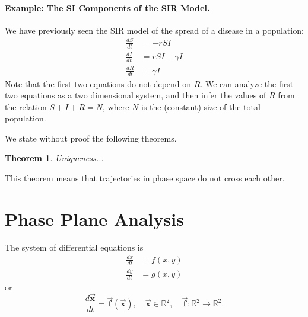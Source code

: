 \documentclass[reqno]{immbook}
\newcommand{\BF}{\vec{\textbf{f}}}
\newcommand{\BX}{\vec{\textbf{x}}}
\newtheorem{theorem}{Theorem}
\begin{document}
\paragraph{Example: The SI Components of the SIR Model.}
We have previously seen the SIR model of the spread of
a disease in a population:
\begin{equation}
\begin{split}
   \frac{dS}{dt} & = -rSI \\
   \frac{dI}{dt} & = rSI -\gamma I \\
   \frac{dR}{dt} & = \gamma I
\end{split}
\end{equation}
Note that the first two equations do not depend on $R$.
We can analyze the first two equations as a two dimensional
system, and then infer the values of $R$ from the
relation $S+I+R=N$, where $N$ is the (constant) size
of the total population.

We state without proof the following theorems.
\begin{theorem}
Uniqueness...
\end{theorem}
This theorem means that trajectories in phase
space do not cross each other.
\section{Phase Plane Analysis}

The system of differential equations is
\begin{equation}
\begin{split}
   \frac{dx}{dt} & = f(x,y) \\
   \frac{dy}{dt} & = g(x,y)
\end{split}
\end{equation}
or
\begin{equation}
  \frac{d\BX}{dt} = \BF(\BX), \quad \BX \in \mathbb{R}^2, \quad
      \BF : \mathbb{R}^2 \rightarrow \mathbb{R}^2.
\end{equation}
\end{document}

